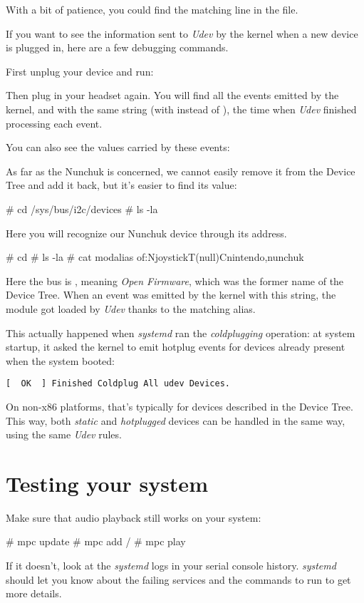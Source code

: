 With a bit of patience, you could find the matching line in the
 file.

If you want to see the information sent to {\em Udev} by the
kernel when a new device is plugged in, here are a few debugging
commands.

First unplug your device and run:


Then plug in your headset again. You will find all the events emitted
by the kernel, and with the same string (with  instead of
), the time when {\em Udev} finished processing each event.

You can also see the  values carried by these events:


As far as the Nunchuk is concerned, we cannot easily remove it from the
Device Tree and add it back, but it's easier to find its 
value:

\begin{bashinput}
# cd /sys/bus/i2c/devices
# ls -la
\end{bashinput}

Here you will recognize our Nunchuk device through its 
address.

\begin{bashinput}
# cd %
# ls -la
# cat modalias
of:NjoystickT(null)Cnintendo,nunchuk
\end{bashinput}

Here the bus is , meaning {\em Open Firmware}, which
was the former name of the Device Tree. When an event was emitted by
the kernel with this  string, the  module
got loaded by {\em Udev} thanks to the matching alias.

This actually happened when {\em systemd} ran the {\em coldplugging}
operation: at system startup, it asked the kernel to emit hotplug events
for devices already present when the system booted:

\begin{verbatim}
[  OK  ] Finished Coldplug All udev Devices.
\end{verbatim}

On non-x86 platforms, that's typically for devices described in the
Device Tree. This way, both {\em static} and {\em hotplugged} devices
can be handled in the same way, using the same {\em Udev} rules.

\section{Testing your system}

Make sure that audio playback still works on your system:

\begin{bashinput}
# mpc update
# mpc add /
# mpc play
\end{bashinput}

If it doesn't, look at the {\em systemd} logs in your serial console
history. {\em systemd} should let you know about the failing services
and the commands to run to get more details.
